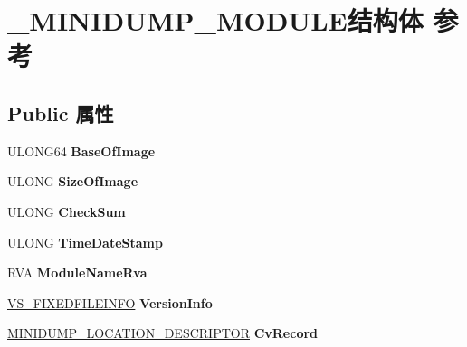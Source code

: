 \hypertarget{struct___m_i_n_i_d_u_m_p___m_o_d_u_l_e}{}\section{\+\_\+\+M\+I\+N\+I\+D\+U\+M\+P\+\_\+\+M\+O\+D\+U\+L\+E结构体 参考}
\label{struct___m_i_n_i_d_u_m_p___m_o_d_u_l_e}
\subsection*{Public 属性}
\begin{DoxyCompactItemize}
\item 
\mbox{\label{struct___m_i_n_i_d_u_m_p___m_o_d_u_l_e_a4c8e4169e21842ebe08bade91f488dbc}} 
U\+L\+O\+N\+G64 {\bfseries Base\+Of\+Image}
\item 
\mbox{\label{struct___m_i_n_i_d_u_m_p___m_o_d_u_l_e_aeeaf8773bc297b408dba8e0dd8cd3a47}} 
U\+L\+O\+NG {\bfseries Size\+Of\+Image}
\item 
\mbox{\label{struct___m_i_n_i_d_u_m_p___m_o_d_u_l_e_af9940232a51c5971292ffd2879e21125}} 
U\+L\+O\+NG {\bfseries Check\+Sum}
\item 
\mbox{\label{struct___m_i_n_i_d_u_m_p___m_o_d_u_l_e_ae12b37508373e086cb187135a33f772a}} 
U\+L\+O\+NG {\bfseries Time\+Date\+Stamp}
\item 
\mbox{\label{struct___m_i_n_i_d_u_m_p___m_o_d_u_l_e_a51ee744bf19f20a3ba28cbdcb5c39a64}} 
R\+VA {\bfseries Module\+Name\+Rva}
\item 
\mbox{\label{struct___m_i_n_i_d_u_m_p___m_o_d_u_l_e_add7a1667323a1d3ed383c6131d79de6b}} 
\hyperlink{structtag_v_s___f_i_x_e_d_f_i_l_e_i_n_f_o}{V\+S\+\_\+\+F\+I\+X\+E\+D\+F\+I\+L\+E\+I\+N\+FO} {\bfseries Version\+Info}
\item 
\mbox{\label{struct___m_i_n_i_d_u_m_p___m_o_d_u_l_e_ae5a88b5c526991f1b0d677727656ca15}} 
\hyperlink{struct___m_i_n_i_d_u_m_p___l_o_c_a_t_i_o_n___d_e_s_c_r_i_p_t_o_r}{M\+I\+N\+I\+D\+U\+M\+P\+\_\+\+L\+O\+C\+A\+T\+I\+O\+N\+\_\+\+D\+E\+S\+C\+R\+I\+P\+T\+OR} {\bfseries Cv\+Record}

\end{DoxyCompactItemize}
